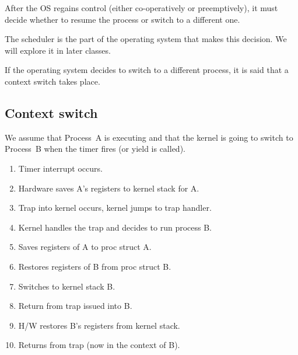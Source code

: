 After the OS regains control (either co-operatively or preemptively), it must decide whether to resume the process or switch to a different one.

The scheduler is the part of the operating system that makes this decision.
We will explore it in later classes.

If the operating system decides to switch to a different process, it is said that a context switch takes place.

\subsection{Context switch}

We assume that Process~A is executing and that the kernel is going to switch to Process~B when the timer fires (or yield is called).

\begin{enumerate}
\item Timer interrupt occurs.
\item Hardware saves A's registers to kernel stack for A.
\item Trap into kernel occurs, kernel jumps to trap handler.
\item Kernel handles the trap and decides to run process B.
\item Saves registers of A to proc struct A.
\item Restores registers of B from proc struct B.
\item Switches to kernel stack B.
\item Return from trap issued into B.
\item H/W restores B's registers from kernel stack.
\item Returns from trap (now in the context of B).
\end{enumerate}

